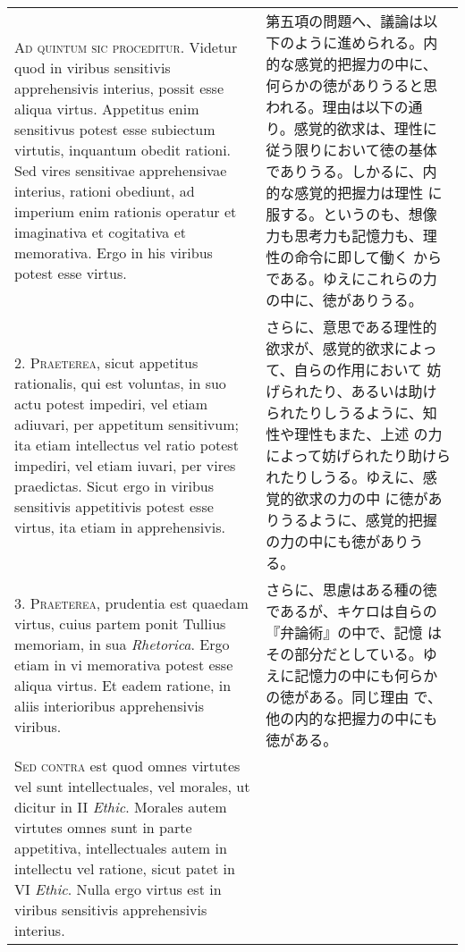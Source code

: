 \documentclass[10pt]{jsarticle}
\begin{document}
\begin{longtable}{p{21em}p{21em}}
{\scshape Ad quintum sic proceditur}. Videtur quod in viribus
sensitivis apprehensivis interius, possit esse aliqua
virtus. Appetitus enim sensitivus potest esse subiectum virtutis,
inquantum obedit rationi. Sed vires sensitivae apprehensivae interius,
rationi obediunt, ad imperium enim rationis operatur et imaginativa et
cogitativa et memorativa. Ergo in his viribus potest esse virtus.

&

第五項の問題へ、議論は以下のように進められる。内的な感覚的把握力の中に、
何らかの徳がありうると思われる。理由は以下の通り。感覚的欲求は、理性に
従う限りにおいて徳の基体でありうる。しかるに、内的な感覚的把握力は理性
に服する。というのも、想像力も思考力も記憶力も、理性の命令に即して働く
からである。ゆえにこれらの力の中に、徳がありうる。
 
 
 
\\

2. {\scshape Praeterea}, sicut appetitus rationalis, qui est voluntas,
in suo actu potest impediri, vel etiam adiuvari, per appetitum
sensitivum; ita etiam intellectus vel ratio potest impediri, vel etiam
iuvari, per vires praedictas. Sicut ergo in viribus sensitivis
appetitivis potest esse virtus, ita etiam in apprehensivis.

&

さらに、意思である理性的欲求が、感覚的欲求によって、自らの作用において
妨げられたり、あるいは助けられたりしうるように、知性や理性もまた、上述
の力によって妨げられたり助けられたりしうる。ゆえに、感覚的欲求の力の中
に徳がありうるように、感覚的把握の力の中にも徳がありうる。
 

\\

3. {\scshape Praeterea}, prudentia est quaedam virtus, cuius partem
ponit Tullius memoriam, in sua {\itshape Rhetorica}. Ergo etiam in vi
memorativa potest esse aliqua virtus. Et eadem ratione, in aliis
interioribus apprehensivis viribus.

&

さらに、思慮はある種の徳であるが、キケロは自らの『弁論術』の中で、記憶
はその部分だとしている。ゆえに記憶力の中にも何らかの徳がある。同じ理由
で、他の内的な把握力の中にも徳がある。
 
\\

{\scshape Sed contra} est quod omnes virtutes vel sunt intellectuales,
vel morales, ut dicitur in II {\itshape Ethic}. Morales autem virtutes
omnes sunt in parte appetitiva, intellectuales autem in intellectu vel
ratione, sicut patet in VI {\itshape Ethic}. Nulla ergo virtus est in
viribus sensitivis apprehensivis interius.


\end{longtable}
\end{document}
